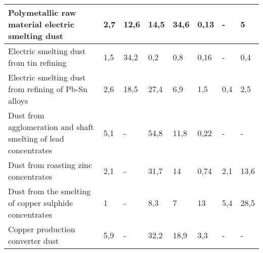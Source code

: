 \begin{table}[H]
\begin{tabular}{|p{}|l|l|l|l|l|l|l|}
Polymetallic raw material electric smelting dust                & 2,7  & 12,6 & 14,5 & 34,6 & 0,13 & -   & 5    \\ \hline
Electric smelting dust from tin refining                        & 1,5  & 34,2 & 0,2  & 0,8  & 0,16 & -   & 0,4  \\ \hline
Electric smelting dust from refining of Pb-Sn alloys            & 2,6  & 18,5 & 27,4 & 6,9  & 1,5  & 0,4 & 2,5  \\ \hline
Dust from agglomeration and shaft smelting of lead concentrates & 5,1  & -    & 54,8 & 11,8 & 0,22 & -   & -    \\ \hline
Dust from roasting zinc concentrates                            & 2,1  & -    & 31,7 & 14   & 0,74 & 2,1 & 13,6 \\ \hline
Dust from the smelting of copper sulphide concentrates          & 1    & -    & 8,3  & 7    & 13   & 5,4 & 28,5 \\ \hline
Copper production converter dust                                & 5,9  & -    & 32,2 & 18,9 & 3,3  & -   & -    \\ \hline
\end{tabular}
\end{table}

